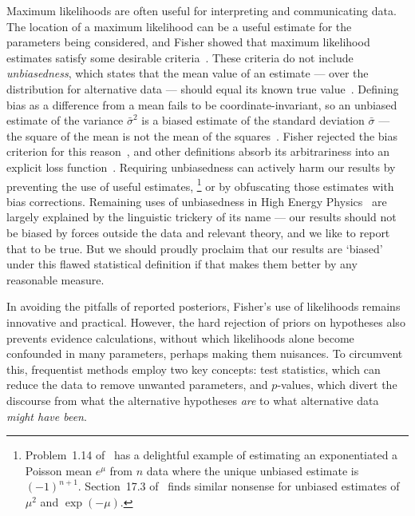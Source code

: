 Maximum likelihoods are often useful for interpreting and communicating data.
The location of a maximum likelihood can be a useful estimate for the
parameters being considered, and Fisher showed that maximum likelihood
estimates satisfy some desirable criteria~\cite{fisher1922estimators}.
These criteria do not include \emph{unbiasedness}, which states that the mean
value of an estimate --- over the distribution for alternative data --- should
equal its known true value~\cite{
sheynin1989aa,
Neyman1937Outline,
pdg2022ynf
}.
Defining bias as a difference from a mean fails to be coordinate-invariant,
so an unbiased estimate of the variance $\bar{\sigma}^2$ is a biased
estimate of the standard deviation $\bar{\sigma}$ --- the square of the mean
is not the mean of the squares~\cite{barlow2019svl}.
Fisher rejected the bias criterion for this
reason~\cite{jaynes2003probability}, and other definitions absorb its
arbitrariness into an explicit loss function~\cite{lehmann2005testing}.
Requiring unbiasedness can actively harm our results by preventing the use of
useful estimates,%
\footnote{%
Problem~1.14 of~\cite{lehmann2005testing} has a delightful example of
estimating an exponentiated a Poisson mean $e^\mu$ from $n$ data
where the unique unbiased estimate is $(-1)^{n + 1}$.
Section~17.3 of~\cite{jaynes2003probability} finds similar nonsense for
unbiased estimates of $\mu^2$ and $\exp(-\mu)$.%
}
or by obfuscating those estimates with bias corrections.
Remaining uses of unbiasedness in High Energy Physics~\cite{
pdg2022ynf,
Tullythesis,
lhcb2018563,
LHCb:2021trn,
LHCb:2015yax
}
are largely explained by the linguistic trickery of its name --- our
results should not be biased by forces outside the data and relevant theory,
and we like to report that to be true.
But we should proudly proclaim that our results are `biased' under this flawed
statistical definition if that makes them better by any reasonable measure.

In avoiding the pitfalls of reported posteriors, Fisher's use of likelihoods
remains innovative and practical.
However, the hard rejection of priors on hypotheses also prevents evidence
calculations, without which likelihoods alone become confounded in many
parameters, perhaps making them nuisances.
To circumvent this, frequentist methods employ two key concepts:
test statistics, which can reduce the data to remove unwanted parameters,
and $p$-values, which divert the discourse
from what the alternative hypotheses \emph{are}
to what alternative data \emph{might have been}.

